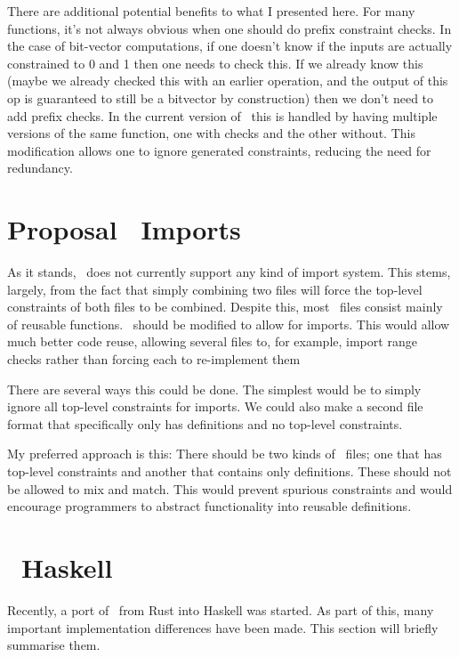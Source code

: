 \documentclass[
    9pt,            %
    techreport,        %
    affiltop,       %
]{art}
\begin{document}
There are additional potential benefits to what I presented here. For many functions, it's not always obvious when one should do prefix constraint checks. In the case of bit-vector computations, if one doesn't know if the inputs are actually constrained to 0 and 1 then one needs to check this. If we already know this (maybe we already checked this with an earlier operation, and the output of this op is guaranteed to still be a bitvector by construction) then we don't need to add prefix checks. In the current version of \VampIR{}\ this is handled by having multiple versions of the same function, one with checks and the other without. This modification allows one to ignore generated constraints, reducing the need for redundancy.

\section{Proposal \VampIR{}\ Imports}

As it stands, \VampIR{}\ does not currently support any kind of import system. This stems, largely, from the fact that simply combining two files will force the top-level constraints of both files to be combined. Despite this, most \VampIR{}\ files consist mainly of reusable functions. \VampIR{}\ should be modified to allow for imports. This would allow much better code reuse, allowing several files to, for example, import range checks rather than forcing each to re-implement them

There are several ways this could be done. The simplest would be to simply ignore all top-level constraints for imports. We could also make a second file format that specifically only has definitions and no top-level constraints.

My preferred approach is this: There should be two kinds of \VampIR{}\ files; one that has top-level constraints and another that contains only definitions. These should not be allowed to mix and match. This would prevent spurious constraints and would encourage programmers to abstract functionality into reusable definitions.

\section{\VampIR{}\ Haskell}

Recently, a port of \VampIR{}\ from Rust into Haskell was started. As part of this, many important implementation differences have been made. This section will briefly summarise them.
\end{document}
